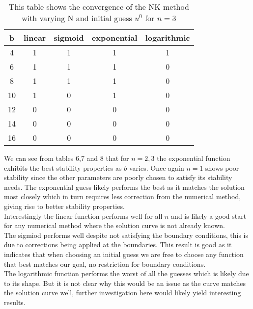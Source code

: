 \documentclass{article}
\begin{document}
\begin{table}[H]
\centering
\begin{tabular}{|c|c|c|c|c|}
\hline
b                                          & linear  & sigmoid & exponential & logarithmic \\
\hline
4                                          & 1 & 1 & 1 & 1\\
6                                          & 1 & 1 & 1 & 0\\
8                                          & 1 & 1 & 1 & 0\\
10                                         & 1 & 0 & 1 & 0\\
12                                         & 0 & 0 & 0 & 0\\
14                                         & 0 & 0 & 0 & 0\\
16                                         & 0 & 0 & 0 & 0\\
\hline
\end{tabular}
\caption{This table shows the convergence of the NK method with varying N and initial guess $u^0$ for $n=3$}
\end{table} 
We can see from tables 6,7 and 8 that for $n=2,3$ the exponential function exhibits the best stability properties as $b$ varies. Once again $n=1$ shows poor stability since the other parameters are poorly chosen to satisfy its stability needs. The exponential guess likely performs the best as it matches the solution most closely which in turn requires less correction from the numerical method, giving rise to better stability properties. \\
Interestingly the linear function performs well for all $n$ and is likely a good start for any numerical method where the solution curve is not already known. \\
The sigmiod performs well despite not satisfying the boundary conditions, this is due to corrections being applied at the boundaries. This result is good as it indicates that when choosing an initial guess we are free to choose any function that best matches our goal, no restriction for boundary conditions. \\
The logarithmic function performs the worst of all the guesses which is likely due to its shape. But it is not clear why this would be an issue as the curve matches the solution curve well, further investigation here would likely yield interesting results. \\
\end{document}

